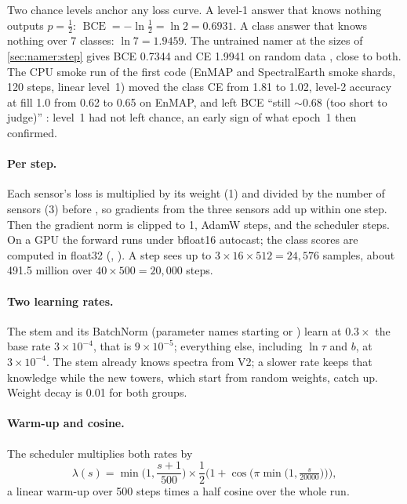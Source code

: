 Two chance levels anchor any loss curve. A level-1 answer that knows nothing outputs $p=\frac12$:
$\operatorname{BCE}=-\ln\frac12=\ln2=0.6931$. A class answer that knows nothing over 7 classes: $\ln7=1.9459$. The
untrained namer at the sizes of \cref{sec:namer:step} gives BCE 0.7344 and CE 1.9941 on random data \tagC, close to both.
The CPU smoke run of the first code (EnMAP and SpectralEarth smoke shards, 120 steps, linear level~1) moved the class
CE from 1.81 to 1.02, level-2 accuracy at fill 1.0 from 0.62 to 0.65 on EnMAP, and left BCE ``still $\sim$0.68 (too
short to judge)'' : level~1 had not left chance, an early sign
of what epoch~1 then confirmed.

\paragraph{Per step.} Each sensor's loss is multiplied by its weight (1) and divided by the number of sensors (3)
before , so gradients from the three sensors add up within one step. Then the gradient norm is clipped
to 1, AdamW \citep{loshchilov2019decoupled} steps, and the scheduler steps. On a GPU the forward runs under bfloat16
autocast; the class scores are computed in float32 (, ). A step sees up to
$3\times16\times512=24{,}576$ samples, about 491.5 million over $40\times500=20{,}000$ steps.

\paragraph{Two learning rates.} The stem and its BatchNorm (parameter names starting  or ) learn
at $0.3\times$ the base rate $3\times10^{-4}$, that is $9\times10^{-5}$; everything else, including $\ln\tau$ and $b$,
at $3\times10^{-4}$. The stem already knows spectra from V2; a slower rate keeps that knowledge while the new towers,
which start from random weights, catch up. Weight decay is 0.01 for both groups.

\paragraph{Warm-up and cosine.} The scheduler multiplies both rates by
\begin{equation}
\lambda(s)=\min\Big(1,\frac{s+1}{500}\Big)\times\frac12\Big(1+\cos\Big(\pi\min\big(1,\tfrac{s}{20000}\big)\Big)\Big),
\end{equation}
a linear warm-up over 500 steps times a half cosine over the whole run.

